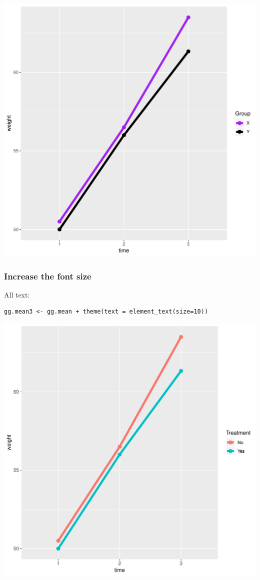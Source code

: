 \documentclass{article}
\begin{document}
\begin{center}
\includegraphics[width=.9\linewidth]{./figures/fig-meanTime2.pdf}
\end{center}

\clearpage

\subsubsection{Increase the font size}
\label{sec:org4c16506}

All text:
\lstset{language=r,label= ,caption= ,captionpos=b,numbers=none}
\begin{lstlisting}
gg.mean3 <- gg.mean + theme(text = element_text(size=10))
\end{lstlisting}

\begin{center}
\includegraphics[width=.9\linewidth]{./figures/fig-meanTime3.pdf}
\end{center}
\end{document}
